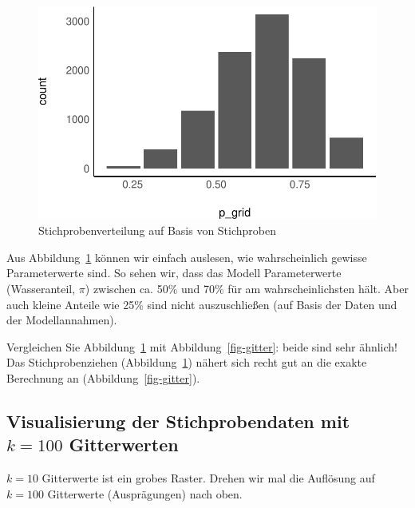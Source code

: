 \documentclass[
  a4paper,
  DIV=11]{scrreprt}
\theoremstyle{definition}
\theoremstyle{remark}
\begin{document}
\begin{figure}

{\centering \includegraphics{./Post_files/figure-pdf/fig-samples1-1.pdf}

}

\caption{\label{fig-samples1}Stichprobenverteilung auf Basis von
Stichproben}

\end{figure}

Aus Abbildung~\ref{fig-samples1} können wir einfach auslesen, wie
wahrscheinlich gewisse Parameterwerte sind. So sehen wir, dass das
Modell Parameterwerte (Wasseranteil, \(\pi\)) zwischen ca. 50\% und 70\%
für am wahrscheinlichsten hält. Aber auch kleine Anteile wie 25\% sind
nicht auszuschließen (auf Basis der Daten und der Modellannahmen).

Vergleichen Sie Abbildung~\ref{fig-samples1} mit
Abbildung~\ref{fig-gitter}: beide sind sehr ähnlich! Das
Stichprobenziehen (Abbildung~\ref{fig-samples1}) nähert sich recht gut
an die exakte Berechnung an (Abbildung~\ref{fig-gitter}).

\hypertarget{visualisierung-der-stichprobendaten-mit-k100-gitterwerten}{%
\subsection{\texorpdfstring{Visualisierung der Stichprobendaten mit
\(k=100\)
Gitterwerten}{Visualisierung der Stichprobendaten mit k=100 Gitterwerten}}\label{visualisierung-der-stichprobendaten-mit-k100-gitterwerten}}

\(k=10\) Gitterwerte ist ein grobes Raster. Drehen wir mal die Auflösung
auf \(k=100\) Gitterwerte (Ausprägungen) nach oben.
\end{document}
